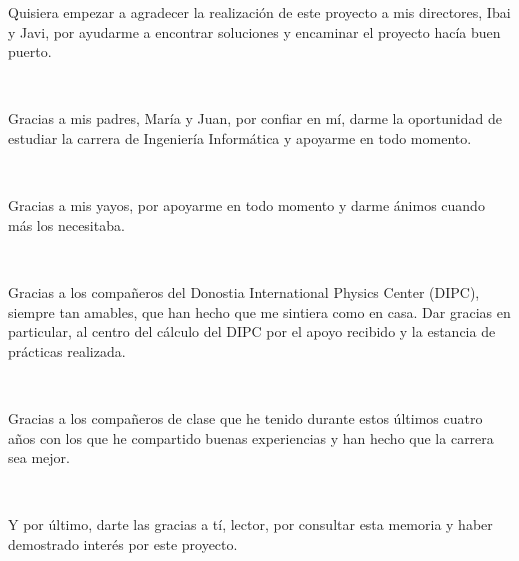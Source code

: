 
\begin{center}
	Quisiera empezar a agradecer la realizaci\'{o}n de este proyecto a mis directores, Ibai y Javi, por ayudarme a encontrar soluciones y encaminar el proyecto hac\'{i}a buen puerto.
	
	\
	
	Gracias a mis padres, Mar\'{i}a y Juan, por confiar en m\'{i}, darme la oportunidad de estudiar la carrera de Ingenier\'{i}a Inform\'{a}tica y apoyarme en todo momento.
	
	\
	
	Gracias a mis yayos, por apoyarme en todo momento y darme \'{a}nimos cuando m\'{a}s los necesitaba.
	
	\
	
	Gracias a los compa\~{n}eros del Donostia International Physics Center (DIPC), siempre tan amables, que han hecho que me sintiera como en casa. Dar gracias en particular, al centro del c\'{a}lculo del DIPC por el apoyo recibido y la estancia de pr\'{a}cticas realizada.
	
	\
	
	Gracias a los compa\~{n}eros de clase que he tenido durante estos \'{u}ltimos cuatro a\~{n}os con los que he compartido buenas experiencias y han hecho que la carrera sea mejor.
	
	\
	
	Y por \'{u}ltimo, darte las gracias a t\'{i}, lector, por consultar esta memoria y haber demostrado inter\'{e}s por este proyecto.
\end{center}